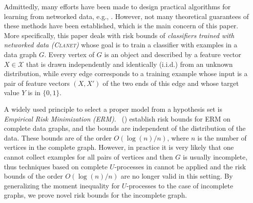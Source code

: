 \documentclass[letterpaper]{article} %
\newcommand{\xspace}{\mathcal{X}}
\newcommand{\pair}[1]{(#1)}
\newcommand{\problemabbr}{\textnormal{C}\textsc{lanet}}
\newcommand{\set}[1]{\{#1\}}
\newcommand{\red}[1]{\textcolor{red}{#1}}
\newcommand{\todo}[1]{\red{\textsc{todo:} #1}}
\newcommand{\citet}[1]{\citeauthor{#1}\ (\citeyear{#1})}
\begin{document}
Admittedly, many efforts have been made to design practical algorithms for learning from networked data, e.g., \cite{liben2007link,macskassy2007classification,li2016robust,garcia2016combining}. 
However, not many theoretical guarantees of these methods have been established, which is the main concern of this paper. More specifically, this paper deals with risk bounds of \emph{classifiers trained with networked data (\problemabbr{})
} whose goal is to train a classifier with examples in a data graph $G$. 
Every vertex of $G$ is an object and described by a feature vector $X\in \xspace{}$ that is drawn independently and identically (i.i.d.) from an unknown distribution, while every edge corresponds to a training example whose input is a pair of feature vectors $\pair{X,X'}$ of the two ends of this edge and whose target value $Y$ is in $\{0,1\}$.

A widely used principle to select a proper model from a hypothesis set is \emph{Empirical Risk Minimization (ERM)}. %
\citet{papa2016graph} establish risk bounds for ERM on complete data graphs, and the bounds are independent of the distribution of the data. 
These bounds are of the order $O(\log(n)/n)$, where $n$ is the number of vertices in the complete graph. 
However, in practice it is very likely that one cannot collect examples for all pairs of vertices and then $G$ is usually incomplete, thus techniques based on complete $U$-processes in \cite{papa2016graph} cannot be applied and the risk bounds of the order $O(\log(n)/n)$ are no longer valid in this setting. 
By generalizing the moment inequality for $U$-processes to the case of incomplete graphs, we prove novel risk bounds for the incomplete graph.  
\end{document}
